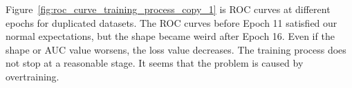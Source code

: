\documentclass[12pt]{article}
\begin{document}
            Figure~\ref{fig:roc_curve_training_process_copy_1} is ROC curves at different epochs for duplicated datasets. The ROC curves before Epoch 11 satisfied our normal expectations, but the shape became weird after Epoch 16. Even if the shape or AUC value worsens, the loss value decreases. The training process does not stop at a reasonable stage. It seems that the problem is caused by overtraining.
            \begin{figure}[htpb]
                \centering
                 \\
\end{figure}
\end{document}
